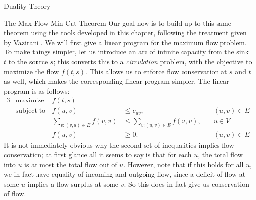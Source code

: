 \begin{section}{Duality Theory}
\begin{subsection}{The Max-Flow Min-Cut Theorem}
	Our goal now is to build up to this same theorem using the tools developed in this chapter,
	following the treatment given by Vazirani \cite{vazirani2002approximation}. 
	We will first give a linear program for the 
	maximum flow problem. To make things simpler, let us introduce an arc of infinite capacity 
	from the sink $t$ to the source $s$; this converts this to a \emph{circulation} problem, 
	with the objective to maximize the flow $f(t,s)$. This allows us to enforce flow conservation 
	at $s$ and $t$ as well, which makes the corresponding linear program simpler. The linear 
	program is as follows:
	\begin{alignat}{3}
		& \text{maximize } & f(t,s)\\
		& \text{subject to } & f(u,v) &\leq c_{uv}, &\quad (u,v)\in E\\ 
				     && \sum_{v:(v,u)\in E} f(v,u) & \leq \sum_{v:(u,v)\in E} f(u,v), &
				     	\quad u\in V &\\
				     && f(u,v) &\geq 0. &\quad (u,v)\in E &
	\end{alignat}
	It is not immediately obvious why the second set of inequalities implies flow conservation; 
	at first glance all 
	it seems to say is that for each $u$, the total flow into $u$ is at most the total flow out 
	of $u$. However, note that if this holds for all $u$, we in fact have equality of incoming and 
	outgoing flow, since a deficit of flow at some $u$ implies a flow surplus at some $v$. So 
	this does in fact give us conservation of flow. 
	

\end{subsection}
\end{section}
